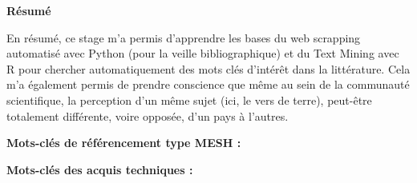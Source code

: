 \documentclass{book}
\begin{document}

\newpage
\thispagestyle{empty}
\begin{center}
    \huge{\textbf{Résumé}}
\end{center}

\vspace{1cm}
En résumé, ce stage m’a permis d'apprendre les bases du web scrapping
automatisé avec Python (pour la veille bibliographique) et du Text Mining avec
R pour chercher automatiquement des mots clés d'intérêt dans la littérature.
Cela m'a également permis de prendre conscience que même au sein de la
communauté scientifique, la perception d'un même sujet (ici, le vers de terre),
peut-être totalement différente, voire opposée, d'un pays à l'autres.

\vspace{\baselineskip} %
\par
\textbf{Mots-clés de référencement type MESH :}
\vspace{\baselineskip} %
\par
\textbf{Mots-clés des acquis techniques : }
\end{document}
